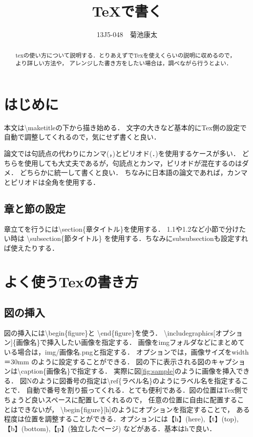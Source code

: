 \documentclass[a4j, twocolumn]{jsarticle}
\title{TeXで書く}
\author{13J5-048　菊池康太}
\date{}
\begin{document}
\begin{abstract}
texの使い方について説明する．とりあえずでTexを使えくらいの説明に収めるので，より詳しい方法や，
アレンジした書き方をしたい場合は，調べながら行うとよい．
\end{abstract}
\maketitle

\section{はじめに}
\label{sec:introduction}
本文は\textbackslash maketitleの下から描き始める．
文字の大きなど基本的にTex側の設定で自動で調整してくれるので，気にせず書くと良い．

論文では句読点の代わりにカンマ(，)とピリオド(．)を使用するケースが多い．
どちらを使用しても大丈夫であるが，句読点とカンマ，ピリオドが混在するのはダメ．
どちらかに統一して書くと良い．
ちなみに日本語の論文であれば，カンマとピリオドは全角を使用する．


\subsection{章と節の設定}
章立てを行うには\textbackslash section\{章タイトル\}を使用する．
1.1や1.2など小節で分けたい時は
\textbackslash subsection\{節タイトル\}
を使用する．ちなみにsubsubsectionも設定すれば使えたりする．




\section{よく使うTexの書き方}
\subsection{図の挿入}
図の挿入には\textbackslash begin\{figure\}と
\textbackslash end\{figure\}を使う．
\textbackslash includegraphics[オプション]\{画像名\}で挿入したい画像を指定する．
画像をimgフォルダなどにまとめている場合は，img/画像名.pngと指定する．
オプションでは，画像サイズをwidth＝30mm のように設定することができる．
図の下に表示される図のキャプションは\textbackslash caption\{画像名\}で指定する．
実際に図\ref{fig:sample}のように画像を挿入できる．
図Nのように図番号の指定は\textbackslash ref\{ラベル名\}のようにラベル名を指定することで．
自動で番号を割り振ってくれる．とても便利である．図の位置はTex側でちょうど良いスペースに配置してくれるので，
任意の位置に自由に配置することはできないが，
\textbackslash begin\{figure\}[h]のようにオプションを指定することで，
ある程度は位置を調整することができる．オプションには【h】(here),【t】(top),
【b】(bottom),【p】(独立したページ) などがある．基本はhで良い．
\end{document}
